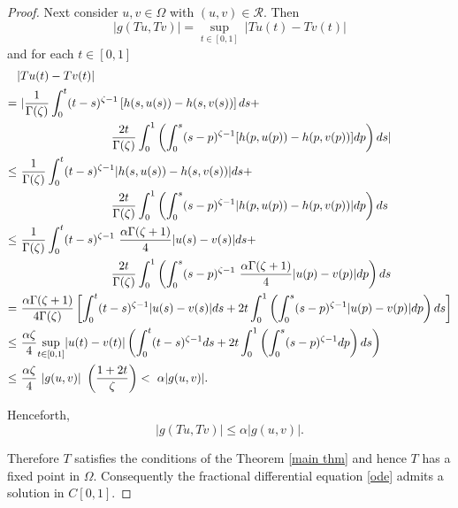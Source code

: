 \documentclass[10pt,a4paper]{amsart}
\begin{document}
\begin{proof}
Next consider $ u, v \in \Omega $ with $ ( u, v ) \in \mathcal{R} $. Then 
$$ | g ( T u, T v ) | =  \underset{t \in [0, 1 ] }{\sup} ~ | T u ( t ) -  T v ( t ) |   $$
and  for each $ t \in [ 0, 1  ] $
\begin{align*}
	&  | T u ( t ) -  T v ( t ) |  \\
	= & ~  | \dfrac{1}{\Gamma ( \zeta )}\int_{0}^{t} ( t- s)^{ \zeta - 1} \left[  h (s, u (s) ) -  h (s, v (s) )  \right] ds + \\
		& \hskip 80 pt  \dfrac{2 t }{\Gamma ( \zeta )} \int_{0}^{1} \left(  \int_{0}^{s} ( s - p)^{ \zeta - 1} [ h  ( p, u ( p ) ) -  h  ( p, v ( p ) ) ] dp \right) ds   |   \\
		\leq & ~ \dfrac{1}{\Gamma ( \zeta )} \int_{0}^{t} ( t- s)^{ \zeta - 1}  |  h (s, u (s) ) -  h (s, v (s) )  | ds + \\
		&  \hskip 80 pt  \dfrac{2 t }{\Gamma ( \zeta )} \int_{0}^{1} \left(  \int_{0}^{s} ( s - p)^{ \zeta - 1} | h  ( p, u ( p ) ) -  h  ( p, v ( p ) )  | dp   \right) ds \\
		\leq & ~  \dfrac{1}{\Gamma ( \zeta )} \int_{0}^{t} ( t- s)^{ \zeta - 1}   ~ \dfrac{\alpha \Gamma ( \zeta + 1 ) }{4} | u ( s ) - v ( s ) | ds + \\
		&  \hskip 80 pt  \dfrac{2 t }{\Gamma ( \zeta )} \int_{0}^{1} \left(  \int_{0}^{s} ( s - p)^{ \zeta - 1} ~ \dfrac{\alpha  \Gamma ( \zeta + 1 ) }{4}  |   u ( p )   -    v ( p )    | dp   \right) ds \\
		= & ~ \dfrac{ \alpha  \Gamma ( \zeta + 1 ) }{ 4 \Gamma ( \zeta )} \left[  \int_{0}^{t} ( t- s)^{ \zeta - 1}  | u ( s ) - v ( s ) | ds  + 2 t \int_{0}^{1} \left(  \int_{0}^{s} ( s - p )^{ \zeta - 1}    |   u ( p )   -    v ( p )    | dp   \right) ds \right]  \\
		\leq & ~ \dfrac{ \alpha    \zeta   }{ 4  }  \underset{t \in [ 0, 1]}{\sup}  |   u ( t )   -    v ( t ) | \left( \int_{0}^{t} ( t- s)^{ \zeta - 1} ds + 2t  \int_{0}^{1} \left(  \int_{0}^{s} ( s - p )^{ \zeta - 1}  dp   \right) ds \right)  \\
		\leq & ~ \dfrac{ \alpha  \zeta  }{ 4  } ~ | g ( u, v )|  ~ \left( \dfrac{1 + 2 t}{\zeta}   \right)  
		<   ~ \alpha | g ( u, v )|. 
\end{align*}

Henceforth,
$$   | g ( T u, T v ) | \leq \alpha | g ( u, v ) |.  $$ 
%

Therefore $T$ satisfies the conditions of the  Theorem \ref{main thm} and hence $T$ has a fixed point in $ \Omega $.  Consequently   the fractional differential equation \ref{ode} admits a solution in $ C [ 0, 1 ] $. 
\end{proof}
\end{document}

